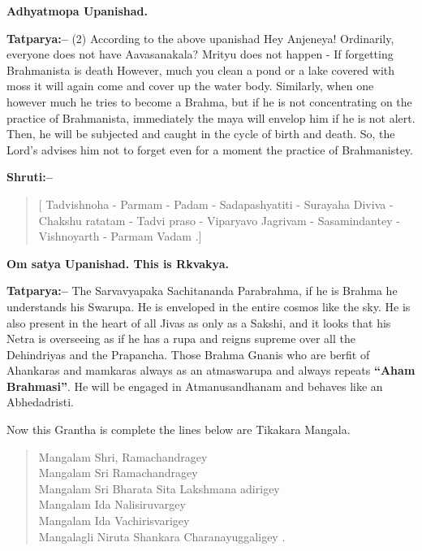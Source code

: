 \begin{flushright}
\textbf{Adhyatmopa Upanishad.}
\end{flushright}

\textbf{Tatparya:–} (2) According to the above upanishad Hey Anjeneya! Ordinarily, everyone does not have Aavasanakala? Mrityu does not happen - If forgetting Brahmanista is death However, much you clean a pond or a lake covered with moss it will again come and cover up the water body. Similarly, when one however much he tries to become a Brahma, but if he is not concentrating on the practice of Brahmanista, immediately the maya will envelop him if he is not alert. Then, he will be subjected and caught in the cycle of birth and death. So, the Lord's advises him not to forget even for a moment the practice of Brahmanistey.

\textbf{Shruti:–}

\begin{verse}
[ Tadvishnoha - Parmam - Padam - Sadapashyatiti - Surayaha  Diviva - Chakshu ratatam - Tadvi praso - Viparyavo Jagrivam - Sasamindantey - Vishnoyarth - Parmam Vadam .]
\end{verse}

\begin{flushright}
\textbf{Om satya Upanishad. This is Rkvakya.}
\end{flushright}

\textbf{Tatparya:–} The Sarvavyapaka Sachitananda Parabrahma, if he is Brahma he understands his Swarupa. He is enveloped in the entire cosmos like the sky. He is also present in the heart of all Jivas as only as a Sakshi, and it looks that his Netra is overseeing as if he has a rupa and reigns supreme over all the Dehindriyas and the Prapancha. Those Brahma Gnanis who are berfit of Ahankaras and mamkaras always as an atmaswarupa and always repeats \textbf{“Aham Brahmasi”}. He will be engaged in Atmanusandhanam and behaves like an Abhedadristi.

Now this Grantha is complete the lines below are Tikakara Mangala.

\begin{verse}
 Mangalam Shri, Ramachandragey \\ Mangalam Sri Ramachandragey \\ Mangalam Sri Bharata Sita Lakshmana adirigey \\ Mangalam Ida Nalisiruvargey \\ Mangalam Ida Vachirisvarigey \\ Mangalagli Niruta Shankara Charanayuggaligey .
\end{verse}

